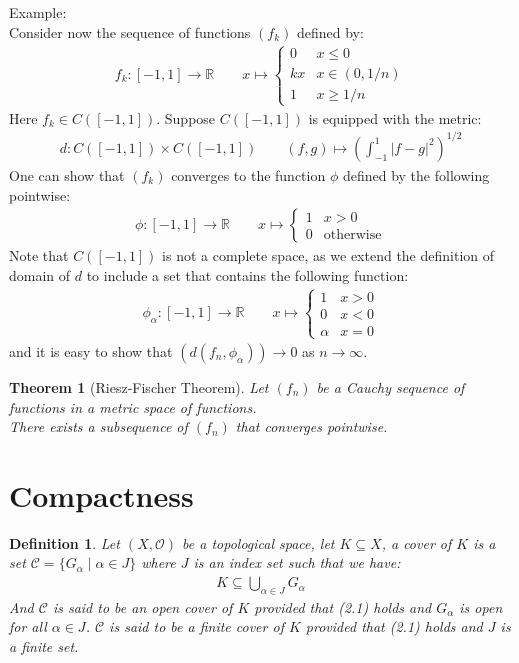 \documentclass[11pt]{book}
\theoremstyle{break}
\theoremstyle{break}
\newtheorem{thm}{Theorem}[section]
\newtheorem{defn}{Definition}[corL]
\newcommand{\R}{\mathbb{R}}
\newcommand{\example}{\color{green}Example: \color{black}}
\begin{document}
\hfill\break
\hfill\break
\hfill\break

\newpage
\example\\
Consider now the sequence of functions $(f_k)$ defined by:
\begin{align*}
f_k:[-1,1] \to \R \qquad x\mapsto \begin{cases} 0 & x\leq 0 \\ kx & x\in (0,1/n) \\ 1 & x\geq 1/n\end{cases}
\end{align*}
Here $f_k \in C([-1,1])$. Suppose $C([-1,1])$ is equipped with the metric:
\begin{align*}
d:C([-1,1])\times C([-1,1]) \qquad (f,g) \mapsto \left(\int_{-1}^1 |f-g|^2 \right)^{1/2}
\end{align*}
One can show that $(f_k)$ converges to the function $\phi$ defined by the following pointwise:
\begin{align*}
\phi:[-1,1]\to \R \qquad x\mapsto \begin{cases} 1 & x>0 \\ 0 & \text{otherwise}\end{cases}
\end{align*}
Note that $C([-1,1])$ is not a complete space, as we extend the definition of domain of $d$ to include a set that contains the following function:
\begin{align*}
\phi_\alpha: [-1,1]\to \R \qquad x\mapsto \begin{cases}
1 & x>0 \\ 0 & x<0 \\ \alpha & x=0
\end{cases}
\end{align*}
and it is easy to show that $(d(f_n,\phi_\alpha)) \to 0$ as $n \to \infty$. 


\hfill\break
\hfill\break
\begin{thm}[Riesz-Fischer Theorem]
Let $(f_n)$ be a Cauchy sequence of functions in a metric space of functions. \\
There exists a subsequence of $(f_n)$ that converges pointwise. 
\end{thm}


\newpage
\section[Compactness]{\color{red} Compactness\color{black}}
\begin{defn}
Let $(X,\mathcal{O})$ be a topological space, let $K \subseteq X$, a cover of $K$ is a set $\mathcal{C} = \{G_{\alpha} \mid \alpha \in J\}$ where $J$ is an index set such that we have:
\begin{align}
K \subseteq \bigcup_{\alpha \in J} G_\alpha
\end{align}
And $\mathcal{C}$ is said to be an open cover of $K$ provided that (2.1) holds and $G_{\alpha}$ is open for all $\alpha \in J$. $\mathcal{C}$ is said to be a finite cover of $K$ provided that (2.1) holds and $J$ is a finite set.
\end{defn}
\end{document}
